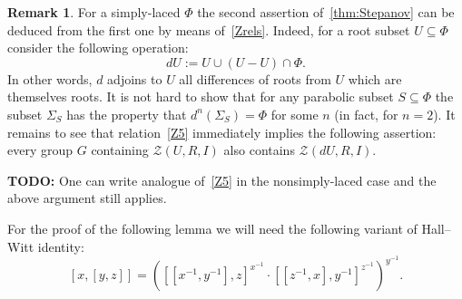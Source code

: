 \documentclass[oneside, 8pt]{amsart}
\theoremstyle{remark}
\theoremstyle{definition}
\newtheorem{rem}[lemma]{Remark}
\numberwithin{equation}{section}
\begin{document}
\begin{rem}
 For a simply-laced $\Phi$ the second assertion of~\cref{thm:Stepanov} can be deduced from the first one by means of~\cref{Zrels}. Indeed, for a root subset $U\subseteq \Phi$ consider the following operation:
 \[dU := U \cup (U - U)\cap \Phi.\]
 In other words, $d$ adjoins to $U$ all differences of roots from $U$ which are themselves roots. It is not hard to show that for any parabolic subset $S \subseteq \Phi$ the subset $\Sigma_S$ has the property that $d^n(\Sigma_S) = \Phi$ for some $n$ (in fact, for $n=2$). It remains to see that relation~\eqref{Z5} immediately implies the following assertion: every group $G$ containing $\mathcal{Z}(U, R, I)$ also contains $\mathcal{Z}(dU, R, I)$.
\end{rem}


{\bf TODO:} One can write analogue of~\eqref{Z5} in the nonsimply-laced case and the above argument still applies.

For the proof of the following lemma we will need the following variant of Hall--Witt identity:
\begin{equation} \label{HW-variant} [x, [ y, z]] = \left([[ x^{-1}, y^{-1}], z] ^ {x^{-1}} \cdot  [[ z^{-1}, x], y^{-1}] ^ {z^{-1}}\right)^{y^{-1}}.\end{equation}
\end{document}
